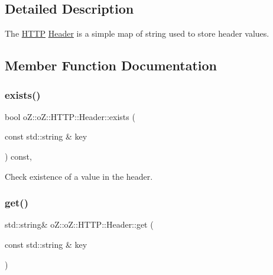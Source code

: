\subsection{Detailed Description}
The \mbox{\hyperlink{namespaceo_z_1_1o_z_1_1_h_t_t_p}{H\+T\+TP}} \mbox{\hyperlink{classo_z_1_1o_z_1_1_h_t_t_p_1_1_header}{Header}} is a simple map of string used to store header values. 

\subsection{Member Function Documentation}
\mbox{\label{classo_z_1_1o_z_1_1_h_t_t_p_1_1_header_ab1d6ccb2829b59d61de00e9000929ede}} 
\subsubsection{\texorpdfstring{exists()}{exists()}}
{\footnotesize\ttfamily bool o\+Z\+::o\+Z\+::\+H\+T\+T\+P\+::\+Header\+::exists (\begin{DoxyParamCaption}\item[{const std\+::string \&}]{key }\end{DoxyParamCaption}) const\hspace{0.3cm}{\ttfamily [inline]}, {\ttfamily [noexcept]}}



Check existence of a value in the header. 

\mbox{\label{classo_z_1_1o_z_1_1_h_t_t_p_1_1_header_a6d679d9431ae700a22accadd77616194}} 
\subsubsection{\texorpdfstring{get()}{get()}\hspace{0.1cm}{\footnotesize\ttfamily [1/2]}}
{\footnotesize\ttfamily std\+::string\& o\+Z\+::o\+Z\+::\+H\+T\+T\+P\+::\+Header\+::get (\begin{DoxyParamCaption}\item[{const std\+::string \&}]{key }\end{DoxyParamCaption})\hspace{0.3cm}{\ttfamily [inline]}}



